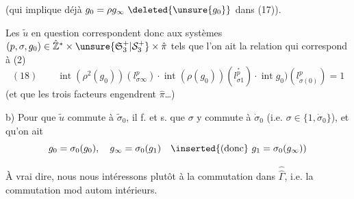 (qui implique déjà $g_0=\rho g_\infty\ \deleted{\unsure{g_0}}$ dans (17)).

Les $\tilde u$ en question correspondent donc aux systèmes $(p,\sigma,g_0)\in\hat{\mathbb Z}^*\times\unsure{\mathfrak S_3^+|\mathcal S_3^+}\times\hat\pi$ tels que l'on ait la relation qui correspond à (2)
\[
(18)\qquad\operatorname{int}(\rho^2(g_0))(l_{\sigma\infty}^p)\cdot\operatorname{int}(\rho(g_0))(l_{\sigma1}^{\overset{*}{p}})\cdot\operatorname{int}g_0)(l_{\sigma(0)}^p)=1
\]
(et que les trois facteurs engendrent $\hat\pi$\ldots)

b) Pour que $\tilde u$ commute à $\tilde\sigma_0$, il f. et s. que $\sigma$ y commute à $\dot\sigma_0$ (i.e. $\sigma\in\{1,\dot\sigma_0\}$), et qu'on ait
\[
g_0=\sigma_0(g_0),\quad g_\infty=\sigma_0(g_1)\quad\inserted{\text{(donc}}\ g_1=\sigma_0(g_\infty))
\]



À vrai dire, nous nous intéressons plutôt à la commutation dans $\widehat{\widehat\Gamma}$, i.e. la commutation mod autom intérieurs.
